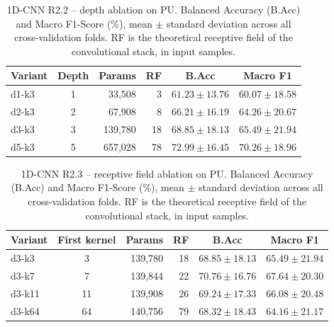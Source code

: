 \begin{table}[ht]
\centering
\caption{1D-CNN R2.2 -- depth ablation on PU. Balanced Accuracy (B.Acc) and Macro F1-Score (\%), mean $\pm$ standard deviation across all cross-validation folds. RF is the theoretical receptive field of the convolutional stack, in input samples.}
\label{tab:ablation_cnn1d_depth_pu}
\begin{tabular}{@{}l c r r c c@{}}
\toprule
\textbf{Variant} & \textbf{Depth} & \textbf{Params} & \textbf{RF} & \textbf{B.Acc} & \textbf{Macro F1} \\ \midrule
d1-k3 & 1 & 33,508 & 3 & $61.23 \pm 13.76$ & $60.07 \pm 18.58$ \\
d2-k3 & 2 & 67,908 & 8 & $66.21 \pm 16.19$ & $64.26 \pm 20.67$ \\
d3-k3 & 3 & 139,780 & 18 & $68.85 \pm 18.13$ & $65.49 \pm 21.94$ \\
d5-k3 & 5 & 657,028 & 78 & $72.99 \pm 16.45$ & $70.26 \pm 18.96$ \\
\bottomrule
\end{tabular}
\end{table}

\begin{table}[ht]
\centering
\caption{1D-CNN R2.3 -- receptive field ablation on PU. Balanced Accuracy (B.Acc) and Macro F1-Score (\%), mean $\pm$ standard deviation across all cross-validation folds. RF is the theoretical receptive field of the convolutional stack, in input samples.}
\label{tab:ablation_cnn1d_kernel_pu}
\begin{tabular}{@{}l c r r c c@{}}
\toprule
\textbf{Variant} & \textbf{First kernel} & \textbf{Params} & \textbf{RF} & \textbf{B.Acc} & \textbf{Macro F1} \\ \midrule
d3-k3 & 3 & 139,780 & 18 & $68.85 \pm 18.13$ & $65.49 \pm 21.94$ \\
d3-k7 & 7 & 139,844 & 22 & $70.76 \pm 16.76$ & $67.64 \pm 20.30$ \\
d3-k11 & 11 & 139,908 & 26 & $69.24 \pm 17.33$ & $66.08 \pm 20.48$ \\
d3-k64 & 64 & 140,756 & 79 & $68.32 \pm 18.43$ & $64.16 \pm 21.17$ \\
\bottomrule
\end{tabular}
\end{table}

